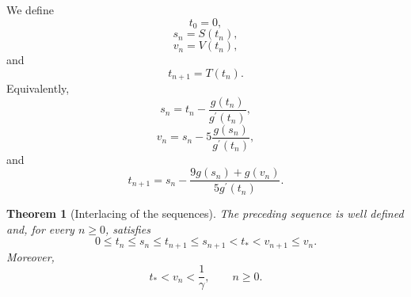 \documentclass[11pt,a4paper]{article}
\numberwithin{equation}{section}
\numberwithin{table}{section}
\theoremstyle{plain}
\newtheorem{theorem}{Theorem}[section]
\theoremstyle{definition}\newtheorem{definition}[theorem]{Definition}
\theoremstyle{remark}\newtheorem{remark}[theorem]{Remark}
\begin{document}
We define 
\begin{equation*}
t_0=0,
\end{equation*}
\begin{equation*}
s_n=S(t_n),
\end{equation*}
\begin{equation*}
v_n=V(t_n),
\end{equation*}
and 
\begin{equation*}
t_{n+1}=T(t_n).
\end{equation*}
Equivalently, 
\begin{equation*}
s_n=t_n-\frac{g(t_n)}{g^{\prime}(t_n)},
\end{equation*}
\begin{equation*}
v_n=s_n-5\frac{g(s_n)}{g^{\prime}(t_n)},
\end{equation*}
and 
\begin{equation*}
t_{n+1}=s_n-\frac{9g(s_n)+g(v_n)}{5g^{\prime}(t_n)}.
\end{equation*}

\begin{theorem}[Interlacing of the sequences]\label{supp:s2chain}
The preceding sequence is well defined and, for every $n\geq0$,
satisfies 
\begin{equation*}
0\leq t_n\leq s_n\leq t_{n+1}\leq s_{n+1}<t_*<v_{n+1}\leq v_n.
\end{equation*}
Moreover, 
\begin{equation*}
t_*<v_n<\frac1\gamma, \qquad n\geq0.
\end{equation*}
\end{theorem}
\end{document}
